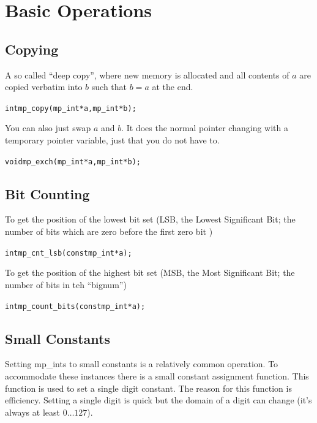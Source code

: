 \documentclass[synpaper]{book}
\begin{document}
\chapter{Basic Operations}
\section{Copying}

A so called ``deep copy'', where new memory is allocated and all contents of $a$ are copied verbatim into $b$ such that $b = a$ at the end.

\begin{alltt}
int mp_copy (mp_int * a, mp_int *b);
\end{alltt}

You can also just swap $a$ and $b$. It does the normal pointer changing with a temporary pointer variable, just that you do not have to.

\begin{alltt}
void mp_exch (mp_int * a, mp_int *b);
\end{alltt}

\section{Bit Counting}

To get the position of the lowest bit set (LSB, the Lowest Significant Bit; the number of bits which are zero before the first zero bit )

\begin{alltt}
int mp_cnt_lsb(const mp_int *a);
\end{alltt}

To get the position of the highest bit set (MSB, the Most Significant Bit; the number of bits in teh ``bignum'')

\begin{alltt}
int mp_count_bits(const mp_int *a);
\end{alltt}

\section{Small Constants}
Setting mp\_ints to small constants is a relatively common operation.  To accommodate these instances there is a
small constant assignment function.  This function is used to set a single digit constant.
The reason for this function is efficiency.  Setting a single digit is quick but the
domain of a digit can change (it's always at least $0 \ldots 127$).
\end{document}
